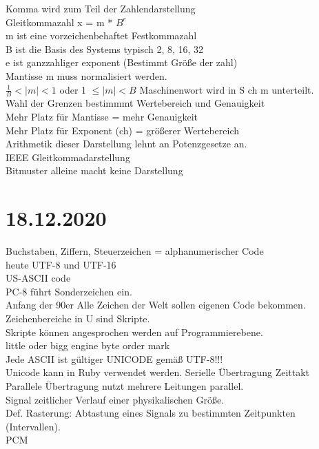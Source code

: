 \documentclass{article}
\begin{document}
	Komma wird zum Teil der Zahlendarstellung \\
	Gleitkommazahl x = m * $B^{e}$ \\
	m ist eine vorzeichenbehaftet Festkommazahl \\
	B ist die Basis des Systems typisch 2, 8, 16, 32 \\
	e ist ganzzahliger exponent (Bestimmt Größe der zahl) \\
	Mantisse m muss normalisiert werden. \\
	$\frac{1}{B}<|m|<1$ oder 1 $\leq |m| < B$
	Maschinenwort wird in S ch m unterteilt. \\
	Wahl der Grenzen bestimmmt Wertebereich und Genauigkeit \\
	Mehr Platz für Mantisse = mehr Genauigkeit \\
	Mehr Platz für Exponent (ch) = größerer Wertebereich \\
	Arithmetik dieser Darstellung lehnt an Potenzgesetze an. \\
	IEEE Gleitkommadarstellung \\
	Bitmuster alleine macht keine Darstellung \\
	\section*{18.12.2020}
	Buchstaben, Ziffern, Steuerzeichen = alphanumerischer Code \\
	heute UTF-8 und UTF-16 \\
	US-ASCII code \\
	PC-8 führt Sonderzeichen ein. \\
	Anfang der 90er Alle Zeichen der Welt sollen eigenen Code bekommen. \\
	Zeichenbereiche in U sind Skripte. \\
	Skripte können angesprochen werden auf Programmierebene. \\
	little oder bigg engine byte order mark \\
	Jede ASCII ist gültiger UNICODE gemäß UTF-8!!! \\
	Unicode kann in Ruby verwendet werden.
	Serielle Übertragung Zeittakt \\
	Parallele Übertragung nutzt mehrere Leitungen parallel. \\
	Signal zeitlicher Verlauf einer physikalischen Größe. \\
	Def. Rasterung: Abtastung eines Signals zu bestimmten Zeitpunkten (Intervallen). \\
	PCM \\
\end{document}
